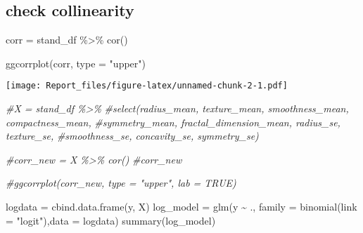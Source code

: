 \documentclass[
]{article}
\newenvironment{Shaded}{\begin{snugshade}}{\end{snugshade}}
\newcommand{\AttributeTok}[1]{\textcolor[rgb]{0.77,0.63,0.00}{#1}}
\newcommand{\CommentTok}[1]{\textcolor[rgb]{0.56,0.35,0.01}{\textit{#1}}}
\newcommand{\FunctionTok}[1]{\textcolor[rgb]{0.00,0.00,0.00}{#1}}
\newcommand{\NormalTok}[1]{#1}
\newcommand{\OtherTok}[1]{\textcolor[rgb]{0.56,0.35,0.01}{#1}}
\newcommand{\SpecialCharTok}[1]{\textcolor[rgb]{0.00,0.00,0.00}{#1}}
\newcommand{\StringTok}[1]{\textcolor[rgb]{0.31,0.60,0.02}{#1}}
\begin{document}
\hypertarget{check-collinearity}{%
\subsection{check collinearity}\label{check-collinearity}}

\begin{Shaded}
\begin{Highlighting}[]
\NormalTok{corr }\OtherTok{=}\NormalTok{ stand\_df }\SpecialCharTok{\%\textgreater{}\%} 
  \FunctionTok{cor}\NormalTok{()}

\FunctionTok{ggcorrplot}\NormalTok{(corr, }\AttributeTok{type =} \StringTok{"upper"}\NormalTok{)}
\end{Highlighting}
\end{Shaded}

\texttt{[image: Report\_files/figure-latex/unnamed-chunk-2-1.pdf]}

\begin{Shaded}
\begin{Highlighting}[]
\CommentTok{\#X = stand\_df \%\textgreater{}\% }
  \CommentTok{\#select(radius\_mean, texture\_mean, smoothness\_mean, compactness\_mean,}
         \CommentTok{\#symmetry\_mean, fractal\_dimension\_mean, radius\_se, texture\_se,}
         \CommentTok{\#smoothness\_se, concavity\_se, symmetry\_se)}

\CommentTok{\#corr\_new = X \%\textgreater{}\% cor()}
\CommentTok{\#corr\_new}

\CommentTok{\#ggcorrplot(corr\_new, type = "upper", lab = TRUE)}
\end{Highlighting}
\end{Shaded}

\begin{Shaded}
\begin{Highlighting}[]
\NormalTok{logdata }\OtherTok{=} \FunctionTok{cbind.data.frame}\NormalTok{(y, X)}
\NormalTok{log\_model }\OtherTok{=} \FunctionTok{glm}\NormalTok{(y }\SpecialCharTok{\textasciitilde{}}\NormalTok{ ., }\AttributeTok{family =} \FunctionTok{binomial}\NormalTok{(}\AttributeTok{link =} \StringTok{"logit"}\NormalTok{),}\AttributeTok{data =}\NormalTok{ logdata)}
\FunctionTok{summary}\NormalTok{(log\_model)}
\end{Highlighting}
\end{Shaded}
\end{document}
